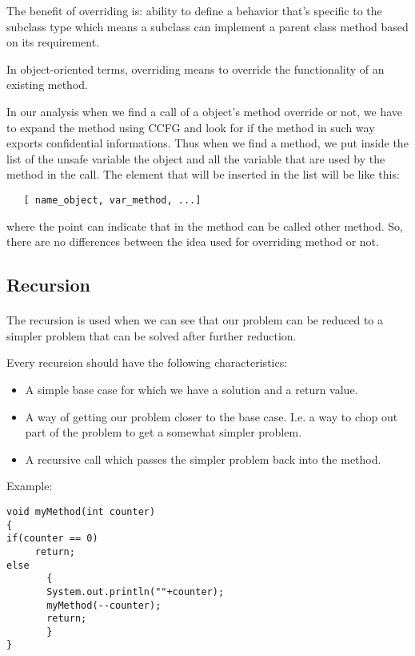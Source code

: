 \documentclass[letterpaper,twocolumn,10pt]{article}
\begin{document}
The benefit of overriding is: ability to define a behavior that's specific to the subclass type which means a subclass can implement a parent class method based on its requirement.

In object-oriented terms, overriding means to override the functionality of an existing method.

In our analysis when we find a call of a object's method override or not, we have to expand the method using CCFG and look for if the method in such way exports confidential informations. Thus when we find a method, we put inside the list of the unsafe variable the object and all the variable that are used by the method in the call. The element that will be inserted in the list will be like this:
\begin{verbatim}
   [ name_object, var_method, ...]
\end{verbatim} 
where the point can indicate that in the method can be called other method. So, there are no differences between the idea used for overriding method or not.

\subsection{Recursion}
\paragraph{}
The recursion is used when we can see that our problem can be reduced to a simpler problem that can be solved after further reduction.

Every recursion should have the following characteristics:

\begin{itemize}
\item A simple base case for which we have a solution and a return value.
\item A way of getting our problem closer to the base case. I.e. a way to chop out part of the problem to get a somewhat simpler problem.
\item A recursive call which passes the simpler problem back into the method. 
\end{itemize}

Example:
\begin{verbatim}
void myMethod(int counter)
{
if(counter == 0)
     return;
else
       {
       System.out.println(""+counter);
       myMethod(--counter);
       return;
       }
}
\end{verbatim}
\end{document}
